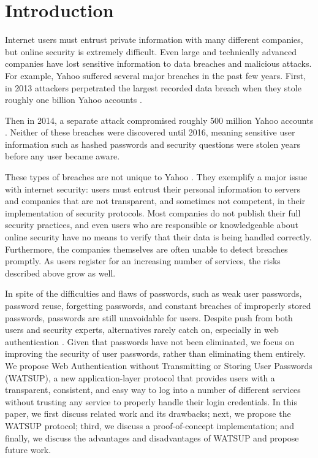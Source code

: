 \section{Introduction}
\label{sec:intro}

Internet users must entrust private information with many different companies, but online security is extremely difficult. Even large and technically advanced companies have lost sensitive information to data breaches and malicious attacks. For example, Yahoo suffered several major breaches in the past few years. First, in 2013 attackers perpetrated the largest recorded data breach when they stole roughly one billion Yahoo accounts \cite{Yahoo_Guardian:2016}.

Then in 2014, a separate attack compromised roughly 500 million Yahoo accounts \cite{Yahoo_CNN:2016}. Neither of these breaches were discovered until 2016, meaning sensitive user information such as hashed passwords and security questions were stolen years before any user became aware.

These types of breaches are not unique to Yahoo \cite{pwned:2016,offenders:2016}. They exemplify a major issue with internet security: users must entrust their personal information to servers and companies that are not transparent, and sometimes not competent, in their implementation of security protocols. Most companies do not publish their full security practices, and even users who are responsible or knowledgeable about online security have no means to verify that their data is being handled correctly. Furthermore, the companies themselves are often unable to detect breaches promptly. As users register for an increasing number of services, the risks described above grow as well.

In spite of the difficulties and flaws of passwords, such as weak user passwords, password reuse, forgetting passwords, and constant breaches of improperly stored passwords, passwords are still unavoidable for users. Despite push from both users and security experts, alternatives rarely catch on, especially in web authentication \cite{microsoft:2011}. Given that passwords have not been eliminated, we focus on improving the security of user passwords, rather than eliminating them entirely.
We propose Web Authentication without Transmitting or Storing User Passwords (WATSUP), a new application-layer protocol that provides users with a transparent, consistent, and easy way to log into a number of different services without trusting any service to properly handle their login credentials. In this paper, we first discuss related work and its drawbacks; next, we propose the WATSUP protocol; third, we discuss a proof-of-concept implementation; and finally, we discuss the advantages and disadvantages of WATSUP and propose future work.
